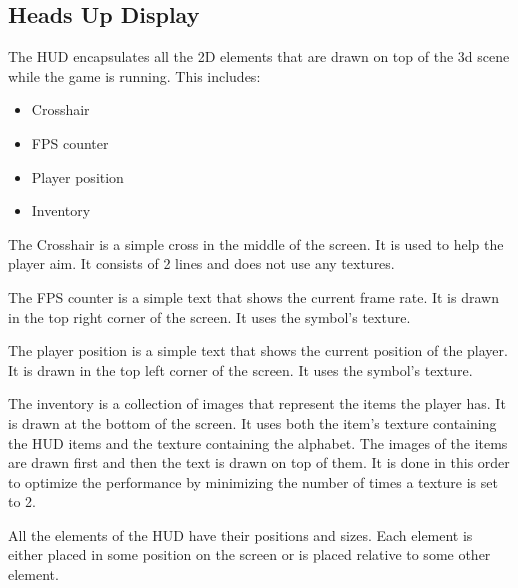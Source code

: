 \subsection{Heads Up Display} \label{sec:hud}
The HUD encapsulates all the 2D elements that are drawn on top of the 3d scene while the game is running.
This includes:
\begin{itemize}
    \item Crosshair
    \item FPS counter
    \item Player position
    \item Inventory
\end{itemize}

The Crosshair is a simple cross in the middle of the screen.
It is used to help the player aim.
It consists of 2 lines and does not use any textures.

The FPS counter is a simple text that shows the current frame rate.
It is drawn in the top right corner of the screen.
It uses the symbol's texture.

The player position is a simple text that shows the current position of the player.
It is drawn in the top left corner of the screen.
It uses the symbol's texture.

The inventory is a collection of images that represent the items the player has.
It is drawn at the bottom of the screen.
It uses both the item's texture containing the HUD items and the texture containing the alphabet.
The images of the items are drawn first and then the text is drawn on top of them.
It is done in this order to optimize the performance by minimizing the number of times a texture is set to 2.

All the elements of the HUD have their positions and sizes.
Each element is either placed in some position on the screen or is placed relative to some other element.